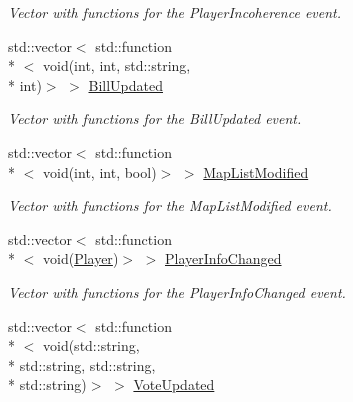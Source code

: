 \begin{DoxyCompactItemize}
\begin{DoxyCompactList}\small\item\em Vector with functions for the Player\-Incoherence event. \end{DoxyCompactList}\item 
\hypertarget{classPlugin_a44ef1f6774366dd3dcc588d7c7afbc8a}{std\-::vector$<$ std\-::function\\*
$<$ void(int, int, std\-::string, \\*
int)$>$ $>$ \hyperlink{classPlugin_a44ef1f6774366dd3dcc588d7c7afbc8a}{Bill\-Updated}}\label{classPlugin_a44ef1f6774366dd3dcc588d7c7afbc8a}

\begin{DoxyCompactList}\small\item\em Vector with functions for the Bill\-Updated event. \end{DoxyCompactList}\item 
\hypertarget{classPlugin_aed57b8e5c978e9de385e165a1668e63e}{std\-::vector$<$ std\-::function\\*
$<$ void(int, int, bool)$>$ $>$ \hyperlink{classPlugin_aed57b8e5c978e9de385e165a1668e63e}{Map\-List\-Modified}}\label{classPlugin_aed57b8e5c978e9de385e165a1668e63e}

\begin{DoxyCompactList}\small\item\em Vector with functions for the Map\-List\-Modified event. \end{DoxyCompactList}\item 
\hypertarget{classPlugin_a2836f95c56beafd0fa2b62f7693a9f3c}{std\-::vector$<$ std\-::function\\*
$<$ void(\hyperlink{structPlayer}{Player})$>$ $>$ \hyperlink{classPlugin_a2836f95c56beafd0fa2b62f7693a9f3c}{Player\-Info\-Changed}}\label{classPlugin_a2836f95c56beafd0fa2b62f7693a9f3c}

\begin{DoxyCompactList}\small\item\em Vector with functions for the Player\-Info\-Changed event. \end{DoxyCompactList}\item 
\hypertarget{classPlugin_a869a88fc900c8a54c2607774cfa44dbc}{std\-::vector$<$ std\-::function\\*
$<$ void(std\-::string, \\*
std\-::string, std\-::string, \\*
std\-::string)$>$ $>$ \hyperlink{classPlugin_a869a88fc900c8a54c2607774cfa44dbc}{Vote\-Updated}}\label{classPlugin_a869a88fc900c8a54c2607774cfa44dbc}


\end{DoxyCompactItemize}
